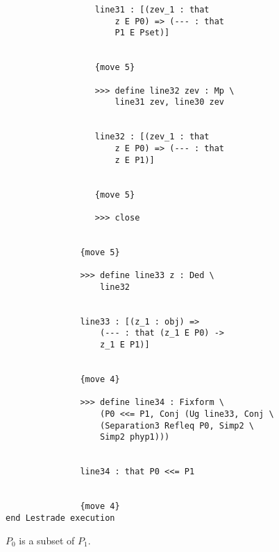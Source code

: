 \documentclass[12pt]{article}
\begin{document}
\begin{verbatim}
                  line31 : [(zev_1 : that 
                      z E P0) => (--- : that 
                      P1 E Pset)]


                  {move 5}

                  >>> define line32 zev : Mp \
                      line31 zev, line30 zev


                  line32 : [(zev_1 : that 
                      z E P0) => (--- : that 
                      z E P1)]


                  {move 5}

                  >>> close


               {move 5}

               >>> define line33 z : Ded \
                   line32


               line33 : [(z_1 : obj) => 
                   (--- : that (z_1 E P0) -> 
                   z_1 E P1)]


               {move 4}

               >>> define line34 : Fixform \
                   (P0 <<= P1, Conj (Ug line33, Conj \
                   (Separation3 Refleq P0, Simp2 \
                   Simp2 phyp1)))


               line34 : that P0 <<= P1


               {move 4}
end Lestrade execution
\end{verbatim}

$P_0$ is a subset of $P_1$.
\end{document}
